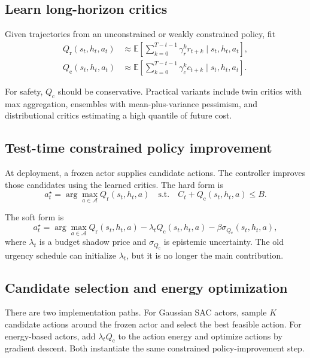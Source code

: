 \documentclass[11pt]{article}
\newcommand{\E}{\mathbb{E}}
\newcommand{\Qr}{Q_{\mathrm r}}
\newcommand{\Qc}{Q_{\mathrm c}}
\newcommand{\Ct}{C_t}
\begin{document}
\subsection{Learn long-horizon critics}

Given trajectories from an unconstrained or weakly constrained policy, fit
\begin{align}
  \Qr(s_t,h_t,a_t) &\approx \E\left[\sum_{k=0}^{T-t-1} \gamma_r^k r_{t+k}\mid s_t,h_t,a_t\right],\\
  \Qc(s_t,h_t,a_t) &\approx \E\left[\sum_{k=0}^{T-t-1} \gamma_c^k c_{t+k}\mid s_t,h_t,a_t\right].
\end{align}

For safety, $\Qc$ should be conservative.
Practical variants include twin critics with max aggregation, ensembles with mean-plus-variance pessimism, and distributional critics estimating a high quantile of future cost.

\subsection{Test-time constrained policy improvement}

At deployment, a frozen actor supplies candidate actions.
The controller improves those candidates using the learned critics.
The hard form is
\begin{equation}
  a_t^\star =
  \arg\max_{a \in \mathcal A}
  \Qr(s_t,h_t,a)
  \quad
  \text{s.t.}
  \quad
  \Ct + \Qc(s_t,h_t,a) \le B.
\end{equation}

The soft form is
\begin{equation}
  a_t^\star =
  \arg\max_{a \in \mathcal A}
  \Qr(s_t,h_t,a)
  - \lambda_t \Qc(s_t,h_t,a)
  - \beta \sigma_{\Qc}(s_t,h_t,a),
\end{equation}
where $\lambda_t$ is a budget shadow price and $\sigma_{\Qc}$ is epistemic uncertainty.
The old urgency schedule can initialize $\lambda_t$, but it is no longer the main contribution.

\subsection{Candidate selection and energy optimization}

There are two implementation paths.
For Gaussian SAC actors, sample $K$ candidate actions around the frozen actor and select the best feasible action.
For energy-based actors, add $\lambda_t \Qc$ to the action energy and optimize actions by gradient descent.
Both instantiate the same constrained policy-improvement step.
\end{document}
